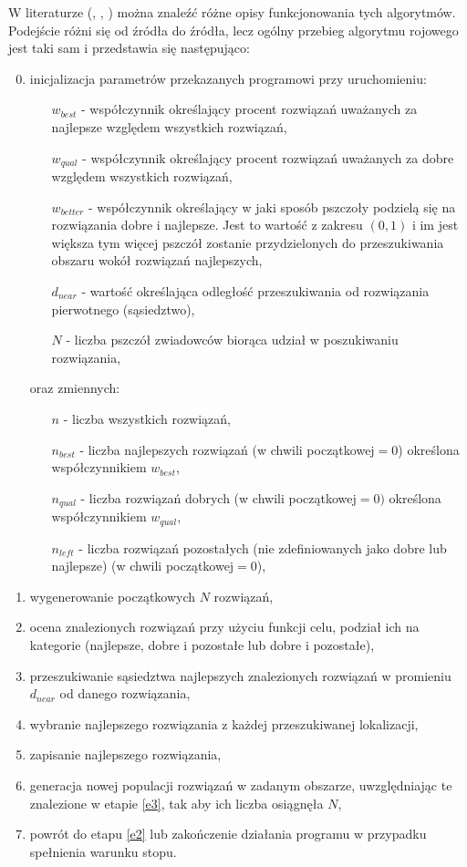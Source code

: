 W literaturze (\cite{algroj}, \cite{algroj2}, \cite{algroj3}) można znaleźć różne opisy funkcjonowania tych algorytmów. Podejście różni się od źródła do źródła, lecz ogólny przebieg algorytmu rojowego jest taki sam i przedstawia się następująco:
\newpage
\begin{enumerate}
    \setcounter{enumi}{-1}
    \item inicjalizacja parametrów przekazanych programowi przy uruchomieniu:
     \begin{itemize}
        \item[$w_{best}$] - współczynnik określający procent rozwiązań uważanych za najlepsze względem wszystkich rozwiązań,
        \item[$w_{qual}$] - współczynnik określający procent rozwiązań uważanych za dobre względem wszystkich rozwiązań,
        \item[$w_{better}$] - współczynnik określający w jaki sposób pszczoły podzielą się na rozwiązania dobre i najlepsze. Jest to wartość z zakresu $(0, 1)$ i im jest większa tym więcej pszczół zostanie przydzielonych do przeszukiwania obszaru wokół rozwiązań najlepszych,
        \item[$d_{near}$] - wartość określająca odległość przeszukiwania od rozwiązania pierwotnego (sąsiedztwo),
        \item[$N$] - liczba pszczół zwiadowców biorąca udział w poszukiwaniu rozwiązania,
    \end{itemize}
     oraz zmiennych:
    \begin{itemize}
        \item[$n$] - liczba wszystkich rozwiązań,
        \item[$n_{best}$] - liczba najlepszych rozwiązań (w chwili początkowej$ = 0$) określona współczynnikiem $w_{best}$,
        \item[$n_{qual}$] - liczba rozwiązań dobrych (w chwili początkowej$ = 0)$ określona współczynnikiem $w_{qual}$,
        \item[$n_{left}$] - liczba rozwiązań pozostałych (nie zdefiniowanych jako dobre lub najlepsze) (w chwili początkowej$ = 0$),
    \end{itemize}
   \label{e1}
   \item wygenerowanie początkowych $N$ rozwiązań,
    \item ocena znalezionych rozwiązań przy użyciu funkcji celu, podział ich na kategorie (najlepsze, dobre i pozostałe lub dobre i pozostałe), \label{e2}
    \item przeszukiwanie sąsiedztwa najlepszych znalezionych rozwiązań w promieniu $d_{near}$ od danego rozwiązania, \label{e3}
     \item wybranie najlepszego rozwiązania z każdej przeszukiwanej lokalizacji, \label{e4}
    \item zapisanie najlepszego rozwiązania, \label{e5}
    \item generacja nowej populacji rozwiązań w zadanym obszarze, uwzględniając te znalezione w etapie \ref{e3}, tak aby ich liczba osiągnęła $N$, \label{e6} 
    \item powrót do etapu \ref{e2} lub zakończenie działania programu w przypadku spełnienia warunku stopu.\label{e7}
\end{enumerate}


